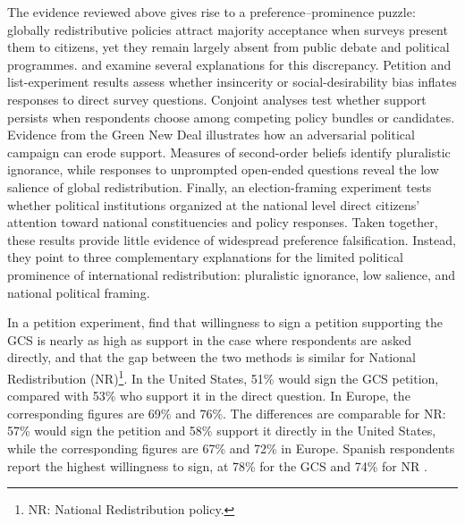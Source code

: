 
The evidence reviewed above gives rise to a preference--prominence puzzle: globally redistributive policies attract majority acceptance when surveys present them to citizens, yet they remain largely absent from public debate and political programmes. \citet{fabre_majority_2025} and \citet{fabre_public_2026} examine several explanations for this discrepancy. Petition and list-experiment results assess whether insincerity or social-desirability bias inflates responses to direct survey questions. Conjoint analyses test whether support persists when respondents choose among competing policy bundles or candidates. Evidence from the Green New Deal illustrates how an adversarial political campaign can erode support. Measures of second-order beliefs identify pluralistic ignorance, while responses to unprompted open-ended questions reveal the low salience of global redistribution. Finally, an election-framing experiment tests whether political institutions organized at the national level direct citizens' attention toward national constituencies and policy responses. Taken together, these results provide little evidence of widespread preference falsification. Instead, they point to three complementary explanations for the limited political prominence of international redistribution: pluralistic ignorance, low salience, and national political framing.

In a petition experiment, \citet{fabre_majority_2025} find that willingness to sign a petition supporting the GCS is nearly as high as support in the case where respondents are asked directly, and that the gap between the two methods is similar for National Redistribution (NR)\footnote{NR: National Redistribution policy.}. In the United States, 51\% would sign the GCS petition, compared with 53\% who support it in the direct question. In Europe, the corresponding figures are 69\% and 76\%. The differences are comparable for NR: 57\% would sign the petition and 58\% support it directly in the United States, while the corresponding figures are 67\% and 72\% in Europe. Spanish respondents report the highest willingness to sign, at 78\% for the GCS and 74\% for NR \citep[Figure S27]{fabre_majority_2025}.

